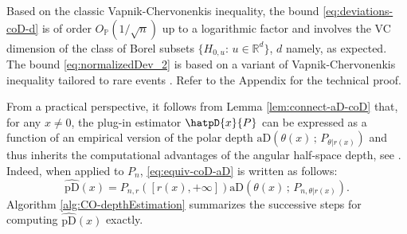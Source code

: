 \documentclass{article}
\numberwithin{equation}{section}
\newcommand{\rset}{\mathbb{R}}
\newcommand{\pDsymbol}{\mathrm{pD}}  %
\newcommand{\hatcoD}[2]{\hatpD{#1}{#2}}
\newcommand{\aD}[2]{{\mathrm{aD}}\left({#1}\,;\,{#2}\right)}
\begin{document}
Based on the classic
Vapnik-Chervonenkis inequality, the bound \eqref{eq:deviations-coD-d}
is of order $O_{\mathbb{P}}(1/\sqrt{n})$ up to a logarithmic factor
and involves the VC dimension of the class of Borel subsets
$\{H_{0,u}:\, u\in \rset^d\}$, $d$ namely, as expected. The bound
\eqref{eq:normalizedDev_2} is based on a variant of
Vapnik-Chervonenkis inequality tailored to rare events
\cite{lhaut2022uniform}. Refer to the Appendix for the technical proof.

From a practical perspective, it follows from Lemma \ref{lem:connect-aD-coD} that, for any $x\neq 0$, the plug-in estimator $\hatcoD{x}{P}$ can be expressed as a function of an empirical version of the polar depth $\aD{\theta(x)}{P_{\theta|r(x)}}$ and thus inherits the
computational advantages of the angular half-space depth, see
\cite{NagyLD21, 10.1007/s11222-025-10700-z}. Indeed, when applied to $P_n$, \eqref{eq:equiv-coD-aD} is written as follows:
\begin{equation*}
     \widehat{\pDsymbol}(x)  =
    P_{n,r}\left([r(x),+\infty]\right)\aD{\theta(x)}{P_{n,\theta|r(x)}}.
\end{equation*}
Algorithm
\ref{alg:CO-depthEstimation} summarizes the successive steps for
computing $\widehat{\pDsymbol}(x)$ exactly.
\end{document}
